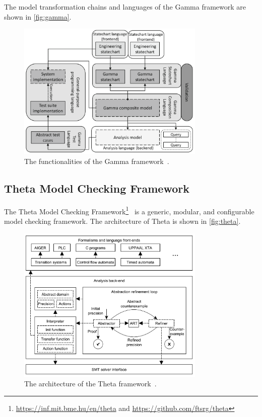 The model transformation chains and languages of the Gamma framework are shown in \autoref{fig:gamma}.

\begin{figure}[htbp]
\centering
\includegraphics[width=0.8\textwidth, keepaspectratio]{figures/gamma.png}
\caption{The functionalities of the Gamma framework~\cite{Graics2020}.}
\label{fig:gamma}
\end{figure}

\subsection{Theta Model Checking Framework}\label{ssec:theta}

The Theta Model Checking Framework\footnote{\url{https://inf.mit.bme.hu/en/theta} and \url{https://github.com/ftsrg/theta}}~\cite{Theta} is a generic, modular, and configurable model checking framework. The architecture of Theta is shown in \autoref{fig:theta}.

\begin{figure}[htbp]
\centering
\includegraphics[width=0.8\textwidth, keepaspectratio]{figures/theta.png}
\caption{The architecture of the Theta framework~\cite{Theta}.}
\label{fig:theta}
\end{figure}

